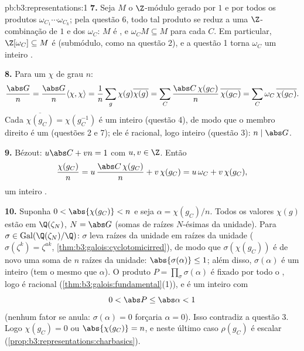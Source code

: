 \begin{solution}{pb:b3:representations:1}
\textbf{7.} Seja $M$ o $\Z$-módulo gerado por $1$ e por todos os
produtos $\omega_{C_1}\cdots\omega_{C_k}$; pela questão 6, todo
tal produto se reduz a uma $\Z$-combinação de $1$ e dos
$\omega_C$: $M$ é , e $\omega_C M
\subseteq M$ para cada $C$. Em particular, $\Z[\omega_C]
\subseteq M$ é  (submódulo, como na questão
2), e a questão 1 torna $\omega_C$ um inteiro .

\textbf{8.} Para um $\chi$  de grau $n$:
\[
\frac{\abs G}{n} = \frac{\abs G}{n}\langle\chi,\chi\rangle
= \frac1n \sum_{g}\chi(g)\overline{\chi(g)}
= \sum_{C}\frac{\abs C\,\chi(g_C)}{n}\,\overline{\chi(g_C)}
= \sum_C \omega_C\,\overline{\chi(g_C)} .
\]
Cada $\overline{\chi(g_C)} = \chi(g_C^{-1})$ é um inteiro
 (questão 4), de modo que o membro direito é um (questões 2 e
7); ele é racional, logo inteiro (questão 3): $n \mid \abs
G$.

\textbf{9.} Bézout: $u\abs C + vn = 1$ com $u, v \in \Z$.
Então
\[
\frac{\chi(g_C)}{n} = u\,\frac{\abs C\,\chi(g_C)}{n} +
v\,\chi(g_C) = u\,\omega_C + v\,\chi(g_C),
\]
um inteiro .

\textbf{10.} Suponha $0 < \abs{\chi(g_C)} < n$ e seja $\alpha
= \chi(g_C)/n$. Todos os valores $\chi(g)$ estão em $\Q(\zeta_N)$, $N =
\abs G$ (somas de raízes $N$-ésimas da unidade). Para $\sigma \in
\operatorname{Gal}(\Q(\zeta_N)/\Q)$: $\sigma$ leva raízes da
unidade em raízes da unidade ($\sigma(\zeta^k) = \zeta^{ak}$,
\cref{thm:b3:galois:cyclotomicirred}), de modo que $\sigma(\chi(g_C))$
é de novo uma soma de $n$ raízes da unidade: $\abs{\sigma(\alpha)}
\leq 1$; além disso, $\sigma(\alpha)$ é um inteiro  (tem
o mesmo  que $\alpha$). O produto $P =
\prod_\sigma \sigma(\alpha)$ é fixado por todo o , logo é racional (\cref{thm:b3:galois:fundamental}(1)),
e é um inteiro  com
\[
0 < \abs P \leq \abs\alpha < 1
\]
(nenhum fator se anula: $\sigma(\alpha) = 0$ forçaria $\alpha =
0$). Isso contradiz a questão 3. Logo $\chi(g_C) = 0$ ou
$\abs{\chi(g_C)} = n$, e neste último caso $\rho(g_C)$ é
escalar (\cref{prop:b3:representations:charbasics}).


\end{solution}
